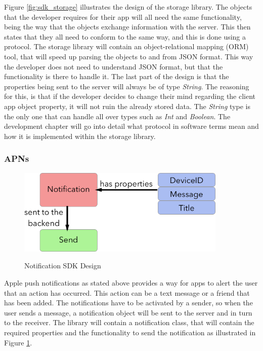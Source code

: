 Figure \ref{fig:sdk_storage} illustrates the design of the storage library. The objects that the developer requires for their app will all need the same functionality, being the way that the objects exchange information with the server. This then states that they all need to conform to the same way, and this is done using a protocol. The storage library will contain an object-relational mapping (ORM) tool, that will speed up parsing the objects to and from JSON format. This way the developer does not need to understand JSON format, but that the functionality is there to handle it. The last part of the design is that the properties being sent to the server will always be of type \textit{String}. The reasoning for this, is that if the developer decides to change their mind regarding the client app object property, it will not ruin the already stored data. The \textit{String} type is the only one that can handle all over types such as \textit{Int} and \textit{Boolean}. The development chapter will go into detail what protocol in software terms mean and how it is implemented within the storage library. 

\subsubsection{APNs} \label{d-sdk:apns}

\begin{figure}[!h]
    \caption{Notification SDK Design}
    \centering
    \includegraphics[width=100mm]{images/design/notification}
    \label{fig:apns_storage}
\end{figure}

Apple push notifications as stated above provides a way for apps to alert the user that an action has occurred. This action can be a text message or a friend that has been added. The notifications have to be activated by a sender, so when the user sends a message, a notification object will be sent to the server and in turn to the receiver. The library will contain a notification class, that will contain the required properties and the functionality to send the notification as illustrated in Figure \ref{fig:apns_storage}.

